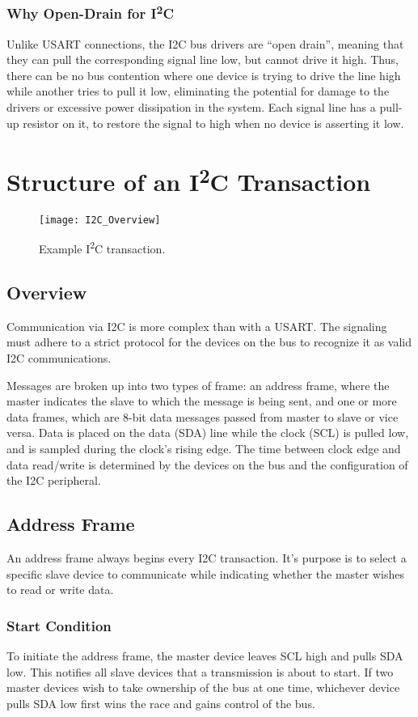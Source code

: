 \documentclass[11pt,fleqn]{book} %
\begin{document}
\subsubsection{Why Open-Drain for I\textsuperscript{2}C}
Unlike USART connections, the I2C bus drivers are “open drain”, meaning that they can pull the corresponding signal line low, but cannot drive it high. Thus, there can be no bus contention where one device is trying to drive the line high while another tries to pull it low, eliminating the potential for damage to the drivers or excessive power dissipation in the system. Each signal line has a pull-up resistor on it, to restore the signal to high when no device is asserting it low.


\section{Structure of an I\textsuperscript{2}C Transaction}
\begin{figure}[]
    \centering\texttt{[image: I2C\_Overview]}
    \caption{Example I\textsuperscript{2}C transaction.}
    \label{overview}
\end{figure}

\subsection{Overview}
Communication via I2C is more complex than with a USART. The signaling must adhere to a strict protocol for the devices on the bus to recognize it as valid I2C communications.  

Messages are broken up into two types of frame: an address frame, where the master indicates the slave to which the message is being sent, and one or more data frames, which are 8-bit data messages passed from master to slave or vice versa. Data is placed on the data (SDA) line while the clock (SCL) is pulled low, and is sampled during the clock's rising edge. The time between clock edge and data read/write is determined by the devices on the bus and the configuration of the I2C peripheral.

\subsection{Address Frame}
An address frame always begins every I2C transaction. It's purpose is to select a specific slave device to communicate while indicating whether the master wishes to read or write data. 
\subsubsection{Start Condition}
To initiate the address frame, the master device leaves SCL high and pulls SDA low. This notifies all slave devices that a transmission is about to start. If two master devices wish to take ownership of the bus at one time, whichever device pulls SDA low first wins the race and gains control of the bus. 
\end{document}
